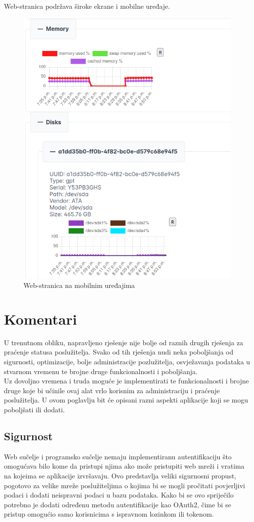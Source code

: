 \documentclass[zavrsnirad]{fer}
\begin{document}
Web-stranica podržava široke ekrane i mobilne uređaje.
\begin{figure}[htb]
	\centering
	\includegraphics[width=0.75\linewidth]{images/web_6.png} 
	\caption{Web-stranica na mobilnim uređajima}
\end{figure}
\FloatBarrier

\chapter{Komentari}
U trenutnom obliku, napravljeno rješenje nije bolje od raznih drugih rješenja za praćenje statusa poslužitelja. Svako od tih rješenja nudi neka poboljšanja od sigurnosti, optimizacije, bolje administracije pozlužitelja, osvježavanja podataka u stvarnom vremenu te brojne druge funkcionalnosti i poboljšanja.
\\Uz dovoljno vremena i truda moguće je implementirati te funkcionalnosti i brojne druge koje bi učinile ovaj alat vrlo korisnim za administraciju i praćenje poslužitelja. U ovom poglavlju bit će opisani razni aspekti aplikacije koji se mogu poboljšati ili dodati.

\section{Sigurnost}
Web sučelje i programsko sučelje nemaju implementiranu autentifikaciju što omogućava bilo kome da pristupi njima ako može pristupiti web mreži i vratima na kojeima se aplikacije izvršavaju. Ovo predstavlja veliki sigurnosni propust, pogotovo za velike mreže poslužiteljima o kojima bi se mogli pročitati povjerljivi podaci i dodati neispravni podaci u bazu podataka. Kako bi se ovo spriječilo potrebno je dodati određenu metodu autentifikacije kao OAuth2, čime bi se pristup omogućio samo korisnicima s ispravnom lozinkom ili tokenom.
\end{document}
